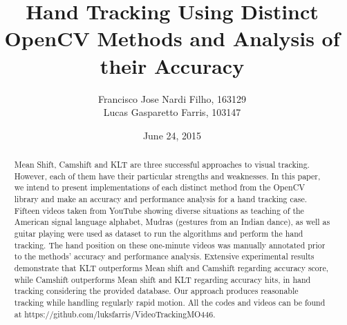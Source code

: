 \documentclass[a4paper]{article}
\title{Hand Tracking Using Distinct OpenCV Methods and Analysis of their Accuracy}
\author{Francisco Jose Nardi Filho, 163129\\ Lucas Gasparetto Farris, 103147}
\date{June 24, 2015}
\begin{document}
\maketitle

\begin{abstract}
\noindent
Mean Shift, Camshift and KLT are three successful approaches to visual tracking. However, each of them have their particular strengths and weaknesses. In this paper, we intend to present implementations of each distinct method from the OpenCV library and make an accuracy and  performance analysis for a hand tracking case. Fifteen videos taken from YouTube showing diverse situations as teaching of the American signal language alphabet, Mudras (gestures from an Indian dance), as well as guitar playing  were used as dataset to run the algorithms and perform the hand tracking. The hand position on these one-minute videos was manually annotated prior to the methods' accuracy and performance analysis. Extensive experimental results demonstrate that KLT outperforms Mean shift and Camshift regarding accuracy score, while Camshift outperforms Mean shift and KLT regarding accuracy hits, in hand tracking considering the provided database. Our approach produces reasonable tracking while handling regularly rapid motion. All the codes and videos can be found at https://github.com/luksfarris/VideoTrackingMO446. 
\end{abstract}
\end{document}
